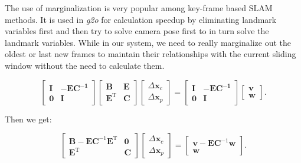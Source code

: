 \documentclass[12pt]{report}   %
\begin{document}
The use of marginalization is very popular among key-frame based SLAM methods. It is used in \textit{g2o} for calculation speedup by eliminating landmark variables first and then try to solve camera pose first to in turn solve the landmark variables. While in our system, we need to really marginalize out the oldest or last new frames to maintain their relationships with the current sliding window without the need to calculate them.








\begin{equation}\label{eq:guasselimination}
\left[ \begin{matrix}
\bm{I}   &    -\bm{EC^{-1}} \\
\bm{0}	 &	  \bm{I}
\end{matrix}\right]
\left[ \begin{matrix}
\bm{B}   &   \bm{E} \\
\bm{E^\mathrm{T}} &   \bm{C}
\end{matrix}\right] 
\left[ \begin{array}{l}
\Delta \bm{x}_c \\
\Delta \bm{x}_p 
\end{array} \right] = 
\left[ \begin{matrix}
\bm{I}   &    -\bm{EC^{-1}}  \\
\bm{0}	 &	  \bm{I}
\end{matrix}
\right]
\left[ \begin{array}{l}
\bm{v} \\
\bm{w} 
\end{array} \right]  .
\end{equation}

Then we get:

\begin{equation}
\left[ \begin{matrix}
\bm{B} - \bm{E}\bm{C}^{-1}\bm{E}^\mathrm{T}	& 	\bm{0} \\
\bm{E}^\mathrm{T}							& 	\bm{C}
\end{matrix} \right]
\left[ \begin{array}{l}
\Delta \bm{x}_c \\
\Delta \bm{x}_p 
\end{array} \right] = 
\left[\begin{array}{l}
\bm{v} - \bm{E}\bm{C}^{-1}\bm{w}  \\
\bm{w}
\end{array}\right].
\label{mid_schur}
\end{equation}
\end{document}
